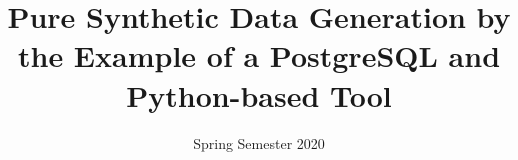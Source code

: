 \title  {Pure Synthetic Data Generation by the Example of a PostgreSQL and Python-based Tool}
\addresses  {\groupname\\\deptname\\\univname} 
\date       {Spring Semester 2020}


\maketitle